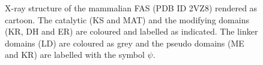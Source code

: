 			\setlength\fboxsep{5pt}
 			\setlength\fboxrule{1.5pt}
			\begin{figure} []
			\centering
			\caption[X-ray structure of the mammalian FAS (PDB ID 2VZ8) rendered as cartoon.]{X-ray structure of the mammalian FAS (PDB ID 2VZ8) rendered as cartoon. The catalytic (KS and MAT) and the modifying domains (KR, DH and ER) are coloured and labelled as indicated. The linker domains (LD) are coloured as grey and the pseudo domains (ME and KR) are labelled with the symbol $ \psi $.}
			\label{fig:mammalianFasStructure}
			\end{figure}			
					
